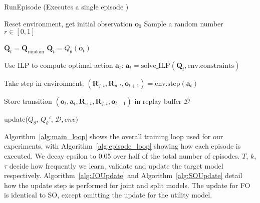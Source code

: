 \begin{algorithm}
\caption{RunEpisode (Executes a single episode )}
\label{alg:episode_loop}
\begin{algorithmic}[1]
    \State Reset environment, get initial observation $\mathbf{o}_0$
        \State Sample a random number $r \in [0, 1]$
        
            \State $\mathbf{Q}_t = \mathbf{Q}_\text{random}$ 
        \Else
            \State $\mathbf{Q}_t = Q_\theta(\mathbf{o}_t)$ 
        \EndIf
        
        \State Use ILP to compute optimal action $\mathbf{a}_t$:
        \State \hspace{1em} $\mathbf{a}_t = \text{solve\_ILP}(\mathbf{Q}_t, \text{env.constraints})$
                
        \State Take step in environment: 
        \State \hspace{1em} $(\mathbf{R}_{f,t}, \mathbf{R}_{u,t}, \mathbf{o}_{t+1}) = \text{env.step}(\mathbf{a}_t)$
        
        \State Store transition $(\mathbf{o}_t, \mathbf{a}_t, \mathbf{R}_{u,t}, \mathbf{R}_{f,t}, \mathbf{o}_{t+1})$ in replay buffer $\mathcal{D}$
        
            \State update($Q_\theta$, $Q_\theta'$, $\mathcal{D}, env)$
        \EndIf
    \EndFor
\EndFunction
\end{algorithmic}
\end{algorithm}




Algorithm~\ref{alg:main_loop} shows the overall training loop used for our experiments, with Algorithm~\ref{alg:episode_loop} showing how each episode is executed. We decay epsilon to 0.05 over half of the total number of episodes. $T$, $k$, $\tau$ decide how frequently we learn, validate and update the target model respectively. 
Algorithm~\ref{alg:JOUpdate} and Algorithm~\ref{alg:SOUpdate} detail how the update step is performed for joint and split models. The update for FO is identical to SO, except omitting the update for the utility model.

